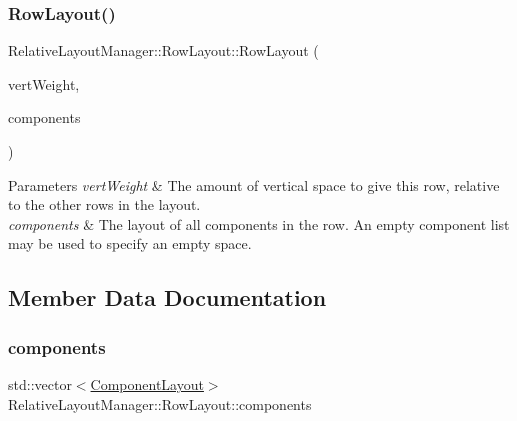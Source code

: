 \subsubsection{\texorpdfstring{Row\+Layout()}{RowLayout()}}
{\footnotesize\ttfamily Relative\+Layout\+Manager\+::\+Row\+Layout\+::\+Row\+Layout (\begin{DoxyParamCaption}\item[{int}]{vert\+Weight,  }\item[{std\+::vector$<$ \mbox{\hyperlink{structRelativeLayoutManager_1_1ComponentLayout}{Component\+Layout}} $>$}]{components }\end{DoxyParamCaption})\hspace{0.3cm}{\ttfamily [inline]}}


\begin{DoxyParams}{Parameters}
{\em vert\+Weight} & The amount of vertical space to give this row, relative to the other rows in the layout.\\
\hline
{\em components} & The layout of all components in the row. An empty component list may be used to specify an empty space. \\
\hline
\end{DoxyParams}


\subsection{Member Data Documentation}
\mbox{\label{structRelativeLayoutManager_1_1RowLayout_a72c20ec2575facd2fc7065542a19a978}} 
\subsubsection{\texorpdfstring{components}{components}}
{\footnotesize\ttfamily std\+::vector$<$\mbox{\hyperlink{structRelativeLayoutManager_1_1ComponentLayout}{Component\+Layout}}$>$ Relative\+Layout\+Manager\+::\+Row\+Layout\+::components}

\mbox{\label{structRelativeLayoutManager_1_1RowLayout_afb33df3a1c79a0235aba277444252b7c}} 
